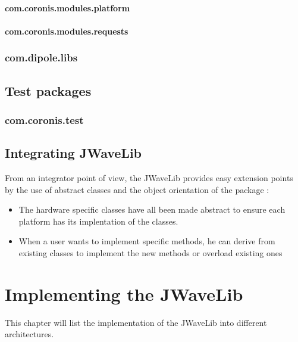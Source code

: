 \documentclass[a4paper,10pt,english]{sphinxmanual}
\begin{document}
\subsubsection{com.coronis.modules.platform}
\label{technical_overview:com-coronis-modules-platform}

\subsubsection{com.coronis.modules.requests}
\label{technical_overview:com-coronis-modules-requests}

\subsection{com.dipole.libs}
\label{technical_overview:com-dipole-libs}

\section{Test packages}
\label{technical_overview:test-packages}

\subsection{com.coronis.test}
\label{technical_overview:com-coronis-test}

\section{Integrating JWaveLib}
\label{technical_overview:integrating-jwavelib}
From an integrator point of view, the JWaveLib provides easy extension points
by the use of abstract classes and the object orientation of the package :
\begin{itemize}
\item {} 
The hardware specific classes have all been made abstract to ensure each platform has its implentation of the classes.

\item {} 
When a user wants to implement specific methods, he can derive from existing classes to implement the new methods or overload existing ones

\end{itemize}


\chapter{Implementing the JWaveLib}
\label{implementation:implementing-the-jwavelib}\label{implementation::doc}
This chapter will list the implementation of the JWaveLib into different
architectures.
\end{document}
